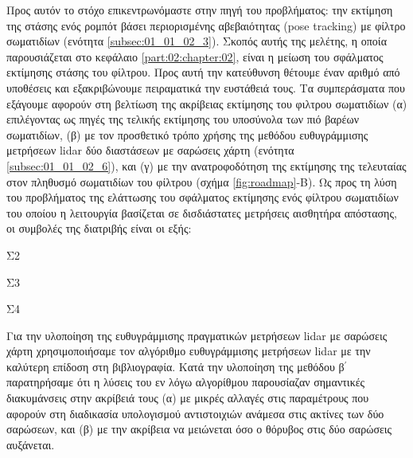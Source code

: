 Προς αυτόν το στόχο επικεντρωνόμαστε στην πηγή του προβλήματος: την εκτίμηση
της στάσης ενός ρομπότ βάσει περιορισμένης αβεβαιότητας (pose tracking) με
φίλτρο σωματιδίων (ενότητα \ref{subsec:01_01_02_3}). Σκοπός αυτής της μελέτης, η
οποία παρουσιάζεται στο κεφάλαιο \ref{part:02:chapter:02}, είναι η μείωση του
σφάλματος εκτίμησης στάσης του φίλτρου. Προς αυτή την κατεύθυνση θέτουμε έναν
αριθμό από υποθέσεις και εξακριβώνουμε πειραματικά την ευστάθειά τους. Τα
συμπεράσματα που εξάγουμε αφορούν στη βελτίωση της ακρίβειας εκτίμησης του
φιλτρου σωματιδίων (α) επιλέγοντας ως πηγές της τελικής εκτίμησης του υποσύνολα
των πιό βαρέων σωματιδίων, (β) με τον προσθετικό τρόπο χρήσης της μεθόδου
ευθυγράμμισης μετρήσεων lidar δύο διαστάσεων με σαρώσεις χάρτη (ενότητα
\ref{subsec:01_01_02_6}), και (γ) με την ανατροφοδότηση της εκτίμησης της
τελευταίας στον πληθυσμό σωματιδίων του φίλτρου (σχήμα \ref{fig:roadmap}-Β). Ως
προς τη λύση του προβλήματος της ελάττωσης του σφάλματος εκτίμησης ενός φίλτρου
σωματιδίων του οποίου η λειτουργία βασίζεται σε δισδιάστατες μετρήσεις
αισθητήρα απόστασης, οι συμβολές της διατριβής είναι οι εξής:

\begin{bw_box}
\begin{customcontribution}{Σ2}
\end{customcontribution}
\end{bw_box}

\begin{bw_box}
\begin{customcontribution}{Σ3}
\end{customcontribution}
\end{bw_box}

\begin{bw_box}
\begin{customcontribution}{Σ4}
\end{customcontribution}
\end{bw_box}

Για την υλοποίηση της ευθυγράμμισης πραγματικών μετρήσεων lidar με σαρώσεις
χάρτη χρησιμοποιήσαμε τον αλγόριθμο ευθυγράμμισης μετρήσεων lidar με την
καλύτερη επίδοση στη βιβλιογραφία. Κατά την υλοποίηση της μεθόδου β$^\prime$
παρατηρήσαμε ότι η λύσεις του εν λόγω αλγορίθμου παρουσίαζαν σημαντικές
διακυμάνσεις στην ακρίβειά τους (α) με μικρές αλλαγές στις παραμέτρους που
αφορούν στη διαδικασία υπολογισμού αντιστοιχιών ανάμεσα στις ακτίνες των δύο
σαρώσεων, και (β) με την ακρίβεια να μειώνεται όσο ο θόρυβος στις δύο σαρώσεις
αυξάνεται.

